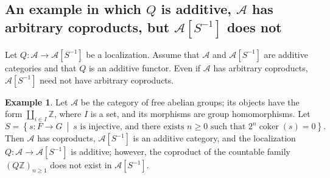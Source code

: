 \documentclass[10pt,a4paper]{amsart}
\theoremstyle{plain}
\theoremstyle{definition}
\newtheorem{example}[theorem]{Example}
\theoremstyle{remark}
\begin{document}
\subsection{\texorpdfstring{An example in which $Q$ is additive, $\mathcal{A}$ has arbitrary coproducts, but $\mathcal{A}[S^{-1}]$ does not}{An example in which Q is additive, A has arbitrary coproducts, but its localization does not}}

Let $Q : \mathcal{A} \longrightarrow \mathcal{A}[S^{-1}]$ be a localization.
Assume that $\mathcal{A}$ and $\mathcal{A}[S^{-1}]$ are additive categories and that $Q$ is an additive functor.
Even if $\mathcal{A}$ has arbitrary coproducts, $\mathcal{A}[S^{-1}]$ need not have arbitrary coproducts.

\begin{example}\label{ex:additive-localization-without-countable-coproduct}
  Let $\mathcal A$ be the category of free abelian groups; its objects have the form $\coprod_{i\in I}\mathbb Z$, where $I$ is a set, and its morphisms are group homomorphisms.
  Let
  \[
    S=\left\{s:F\longrightarrow G\ \middle|\
    s\text{ is injective, and there exists $n\geq0$ such that }2^n\operatorname{coker}(s)=0\right\}.
  \]
  Then $\mathcal A$ has coproducts, $\mathcal A[S^{-1}]$ is an additive category, and the localization $Q:\mathcal A\longrightarrow\mathcal A[S^{-1}]$ is additive; however, the coproduct of the countable family $(Q\mathbb Z)_{n\geq1}$ does not exist in $\mathcal A[S^{-1}]$.
\end{example}
\end{document}
